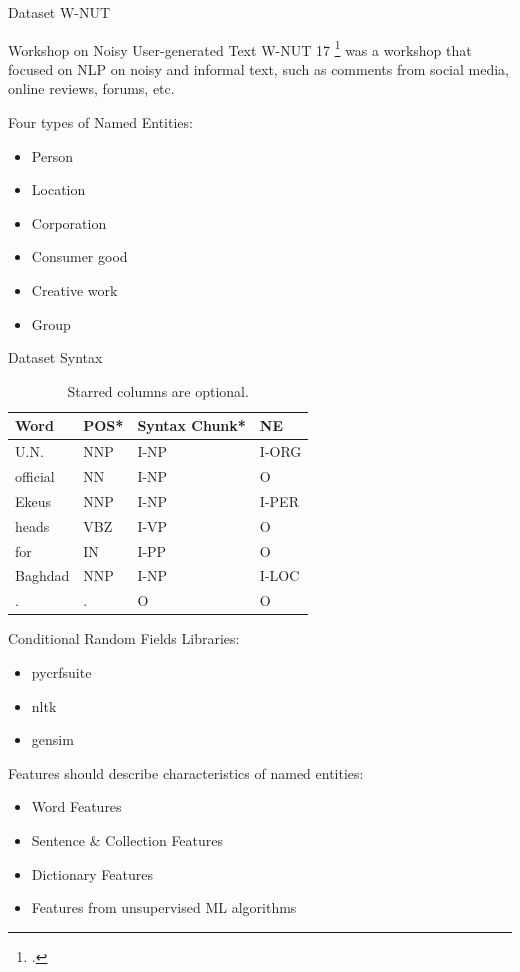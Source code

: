 \documentclass[12pt, tikz]{beamer}
\begin{document}
\begin{frame}[fragile]{Dataset W-NUT}
	
	\begin{block}{Workshop on Noisy User-generated Text}
		W-NUT 17 \footcite{derczynski2017results} was a workshop that focused on NLP on noisy and informal text, such as comments from social media, online reviews, forums, etc.
	\end{block}
	\pause
	Four types of Named Entities:
	\begin{itemize}
		\item Person
		\item Location
		\item Corporation
		\item Consumer good
		\item Creative work
		\item Group 
	\end{itemize}
	
\end{frame}

\begin{frame}[fragile]{Dataset Syntax}
	\begin{center}
		\begin{table}
		\begin{tabular}{l | l | l | l}
			Word & POS* & Syntax Chunk* & NE \\
			\hline
			U.N. & NNP & I-NP & I-ORG 
\\
			official & NN & I-NP & O 
\\
			Ekeus & NNP & I-NP & I-PER \\ 
			heads & VBZ & I-VP & O 
\\
			for & IN & I-PP & O \\
			Baghdad & NNP & I-NP & I-LOC \\ 
			. & . & O & O \\
		\end{tabular}
		\caption{Starred columns are optional.}
		\end{table}
	\end{center}
\end{frame}

\begin{frame}[fragile]{Conditional Random Fields}
	Libraries:
	\begin{itemize}
		\item pycrfsuite
		\item nltk
		\item gensim
	\end{itemize}
	\pause
	
	Features should describe characteristics of named entities:
	\begin{itemize}
		\item<2-> Word Features
		\item<3-> Sentence \& Collection Features
		\item<4-> Dictionary Features
		\item<5-> Features from unsupervised ML algorithms
	\end{itemize}
\end{frame}
\end{document}
